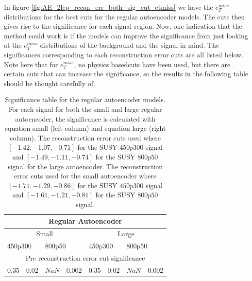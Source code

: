 In figure \ref{fig:AE_2lep_recon_err_both_sig_cut_etmiss} we have the $e_T^{miss}$ distributions for the best cuts for the regular autoencoder models.
The cuts then gives rise to the significance for each signal region. Now, one indication that the method could work is if the models can improve the 
significance from just looking at the $e_T^{miss}$ distributions of the background and the signal in mind. The significances corresponding to each 
reconstruction error cuts are all listed below. Note here that for $e_T^{miss}$, no physics basedcuts have been used, but there are certain cuts 
that can increase the significance, so the results in the following table should be thought carefully of.

\begin{table}[H]
    \centering
    \caption[Significance table regular autoencoder]{Significance table for the regular autoencoder models. For each signal for both the small and 
    large regular autoencoder, the significance is calculated with equation small (left column) and equation large (right column). The 
    reconstruction error cuts used where $[-1.42, -1.07, -0.71]$ for the SUSY $450p300$ signal and $[-1.49, -1.11, -0.74]$ for the SUSY 
    $800p50$ signal for the large autoencoder. The reconstruction error cuts used for the small autoencoder where $[-1.71, -1.29, -0.86]$ 
    for the SUSY $450p300$ signal and $[-1.61, -1.21, -0.81]$ for the SUSY $800p50$ signal. }
    \label{tab:AE_2lep_significance}
    \begin{tabular}{|llllllll|}
    \hline
    \multicolumn{8}{|c|}{Regular Autoencoder}                                                                                                                                    \\ \hline
    \multicolumn{4}{|c|}{Small}                                                                    & \multicolumn{4}{c|}{Large}                                                  \\ \hline
    \multicolumn{2}{|l|}{450p300}                  & \multicolumn{2}{l|}{800p50}                   & \multicolumn{2}{l|}{450p300}                  & \multicolumn{2}{l|}{800p50} \\ \hline
    \multicolumn{8}{|c|}{Pre reconstruction error cut significance}                                                                                                                           \\ \hline
    \multicolumn{1}{|l|}{0.35} & \multicolumn{1}{l|}{0.02} & \multicolumn{1}{l|}{$NaN$} & \multicolumn{1}{l|}{0.002} & \multicolumn{1}{l|}{0.35} & \multicolumn{1}{l|}{0.02} & \multicolumn{1}{l|}{$NaN$}  & \multicolumn{1}{l|}{0.002} \\ \hline

\end{tabular}
\end{table}
